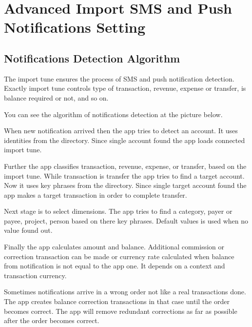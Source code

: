 \documentclass[a4paper,10pt,english]{sphinxmanual}
\begin{document}
\chapter{Advanced Import SMS and Push Notifications Setting}
\label{\detokenize{notifications:advanced-import-sms-and-push-notifications-setting}}\label{\detokenize{notifications:chapter-notifications}}\label{\detokenize{notifications::doc}}

\section{Notifications Detection Algorithm}
\label{\detokenize{notifications:notifications-detection-algorithm}}
The import tune ensures the process of SMS and push notification detection. Exactly import
tune controls type of transaction, revenue, expense or transfer, is balance required or not,
and so on.

You can see the algorithm of notifications detection at the picture below.


When new notification arrived then the app tries to detect an account. It uses identities from the
 directory. Since single account found the app loads connected import tune.

Further the app classifies transaction, revenue, expense, or transfer, based on the import tune.
While transaction is transfer the app tries to find a target account. Now it uses key phrases from the
 directory. Since single target account found the app makes a target transaction
in order to complete transfer.

Next stage is to select dimensions. The app tries to find a category, payer or payee, project, person
based on there key phrases. Default values is used when no value found out.

Finally the app calculates amount and balance. Additional commission or correction
transaction can be made or currency rate calculated when balance from notification is not equal to the app one.
It depends on a context and transaction currency.

Sometimes notifications arrive in a wrong order not like a real transactions done. The app
creates balance correction transactions in that case until the order becomes correct.
The app will remove redundant corrections as far as possible after the order becomes correct.
\end{document}
